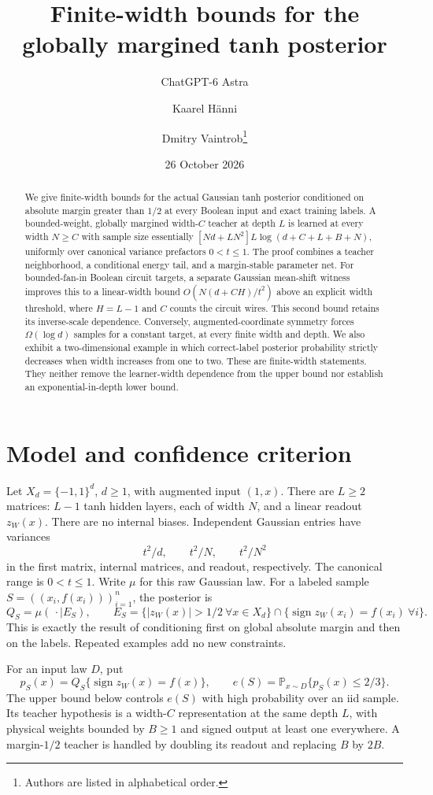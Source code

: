 \documentclass[11pt]{article}
\title{Finite-width bounds for the globally margined tanh posterior}
\author{ChatGPT-6 Astra \and Kaarel H\"anni \and Dmitry Vaintrob\thanks{Authors are listed in alphabetical order.}}
\date{26 October 2026}
\theoremstyle{remark}\newtheorem{remark}[theorem]{Remark}
\newcommand{\Prb}{\mathbb P}
\begin{document}
\maketitle
\begin{abstract}
We give finite-width bounds for the actual Gaussian tanh posterior conditioned on
absolute margin greater than $1/2$ at every Boolean input and exact training
labels. A bounded-weight, globally margined width-$C$ teacher at depth $L$
is learned at every width $N\ge C$ with sample size essentially
$[Nd+LN^2]L\log(d+C+L+B+N)$, uniformly over canonical variance prefactors
$0<t\le1$. The proof combines a teacher neighborhood, a conditional energy
tail, and a margin-stable parameter net. For bounded-fan-in Boolean circuit
targets, a separate Gaussian mean-shift witness improves this to a
linear-width bound $O(N(d+CH)/t^2)$ above an explicit width threshold,
where $H=L-1$ and $C$ counts the circuit wires. This second bound retains
its inverse-scale dependence. Conversely, augmented-coordinate
symmetry forces $\Omega(\log d)$ samples for a constant target, at every
finite width and depth. We also exhibit a two-dimensional example in which
correct-label posterior probability strictly decreases when width increases
from one to two. These are finite-width statements. They neither remove
the learner-width dependence from the upper bound nor establish an
exponential-in-depth lower bound.
\end{abstract}

\section{Model and confidence criterion}

Let $X_d=\{-1,1\}^d$, $d\ge1$, with augmented input $(1,x)$.
There are $L\ge2$ matrices: $L-1$ tanh hidden layers, each of width $N$,
and a linear readout $z_W(x)$. There are no internal biases. Independent
Gaussian entries have variances
\[
 t^2/d,\qquad t^2/N,\qquad t^2/N^2
\]
in the first matrix, internal matrices, and readout, respectively.
The canonical range is $0<t\le1$. Write $\mu$ for this raw Gaussian law.
For a labeled sample $S=((x_i,f(x_i)))_{i=1}^n$, the posterior is
\[
 Q_S=\mu(\,\cdot\mid E_S),\qquad
 E_S=\{|z_W(x)|>1/2\ \forall x\in X_d\}
          \cap\{\operatorname{sign}z_W(x_i)=f(x_i)\ \forall i\}.
\]
This is exactly the result of conditioning first on global absolute
margin and then on the labels. Repeated examples add no new constraints.

For an input law $D$, put
\[
 p_S(x)=Q_S\{\operatorname{sign}z_W(x)=f(x)\},\qquad
 e(S)=\Prb_{x\sim D}\{p_S(x)\le2/3\}.
\]
The upper bound below controls $e(S)$ with high probability over an iid
sample. Its teacher hypothesis is a width-$C$ representation at the same
depth $L$, with physical weights bounded by $B\ge1$ and signed output
at least one everywhere. A margin-$1/2$ teacher is handled by doubling
its readout and replacing $B$ by $2B$.
\end{document}
